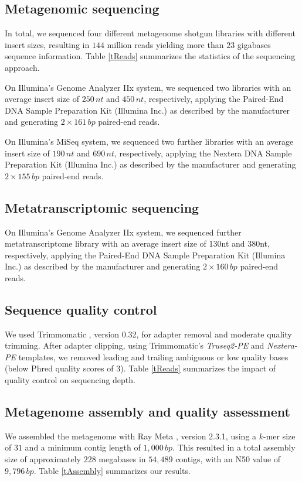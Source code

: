 \documentclass{bmcart}
\begin{document}
\subsection*{Metagenomic sequencing}
In total, we sequenced four different metagenome shotgun libraries with different insert sizes, resulting in $144$ million reads yielding more than $23$ gigabases sequence information. Table \ref{tReads} summarizes the statistics of the sequencing approach.

On Illumina's Genome Analyzer IIx system, we sequenced two libraries with an average insert size of $250\,nt$ and $450\,nt$, respectively, applying the Paired-End DNA Sample Preparation Kit (Illumina Inc.) as described by the manufacturer and generating $2 \times 161\,bp$ paired-end reads.

On Illumina's MiSeq system, we sequenced two further libraries with an average insert size of $190\,nt$ and $690\,nt$, respectively, applying the Nextera DNA Sample Preparation Kit (Illumina Inc.) as described by the manufacturer and generating $2 \times 155\,bp$ paired-end reads.

\subsection*{Metatranscriptomic sequencing}

On Illumina's Genome Analyzer IIx system, we sequenced further metatranscriptome library with an average insert size of 130nt and 380nt, respectively, applying the Paired-End DNA Sample Preparation Kit (Illumina Inc.) as described by the manufacturer and generating $2 \times 160\,bp$ paired-end reads.

\subsection*{Sequence quality control}
We used Trimmomatic \cite{Trimmomatic}, version 0.32, for adapter removal and moderate quality trimming.
After adapter clipping, using Trimmomatic's \emph{Truseq2-PE} and \emph{Nextera-PE} templates, we removed leading and trailing ambiguous or low quality bases (below Phred quality scores of 3).
Table \ref{tReads} summarizes the impact of quality control on sequencing depth.

\subsection*{Metagenome assembly and quality assessment}
We assembled the metagenome with Ray Meta \cite{RayMeta}, version 2.3.1, using a $k$-mer size of $31$ and a minimum contig length of $1,000\,bp$.
This resulted in a total assembly size of approximately $228$ megabases in $54,489$ contigs, with an N50 value of $9,796\,bp$. %
Table \ref{tAssembly} summarizes our results.
\end{document}
